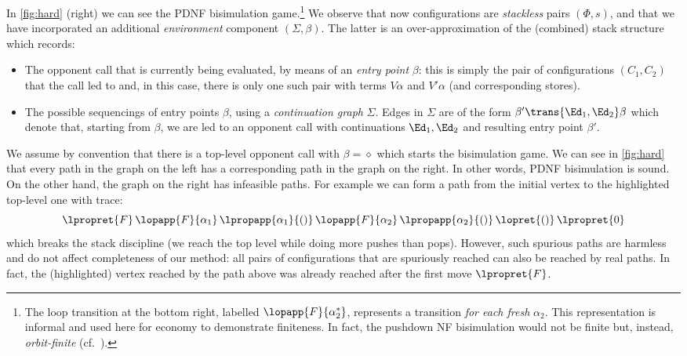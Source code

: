 \begin{example}
In \cref{fig:hard} (right) we can see the PDNF bisimulation game.\footnote{The loop transition at the bottom right, labelled $\lopapp{F}{\alpha_2^*}$, represents a transition \emph{for each fresh} $\alpha_2$. This representation is informal and used here for economy to demonstrate finiteness. In fact, the pushdown NF bisimulation would not be finite but, instead, \emph{orbit-finite} (cf.\ ).} We observe that now configurations are \emph{stackless} pairs $(\Phi,s)$, and that we have incorporated an additional \emph{environment} component $(\Sigma,\beta)$. The latter is an over-approximation of the (combined) stack structure which records:
\begin{itemize}
\item
  The opponent call that is currently being evaluated, by means of an \emph{entry point} $\beta$: this is simply the pair of configurations $(C_1,C_2)$ that the call led to and, in this case, there is only one such pair
  with terms $V\alpha$ and $V'\alpha$ (and corresponding stores).
\item
  The possible sequencings of entry points $\beta$, using a \emph{continuation graph} $\Sigma$.
  Edges in $\Sigma$ are of the form $\beta'\trans{\Ed_1,\Ed_2}\beta$ which denote that, starting from $\beta$, we are led to an opponent call 
  with continuations $\Ed_1,\Ed_2$ and resulting entry point $\beta'$.
\end{itemize}
We assume by convention that there is a top-level opponent call with $\beta=\diamond$ which starts the bisimulation game. We can see in \cref{fig:hard} that every path in the graph on the left has a corresponding path in the graph on the right. In other words, PDNF bisimulation is sound.
On the other hand, the graph on the right has infeasible paths. For example we can form a path from the initial vertex to the highlighted top-level one with trace:
\[
\lpropret{F}\,\lopapp{F}{\alpha_1}\,\lpropapp{\alpha_1}{()}\,\lopapp{F}{\alpha_2}\,\lpropapp{\alpha_2}{()}\,\lopret{()}\,\lpropret{0}
\]
which breaks the stack discipline (we reach the top level while doing more pushes than pops). However, such spurious paths are harmless and do not affect completeness of our method: all pairs of configurations that are spuriously reached can also be reached by real paths. In fact, the  (highlighted) vertex reached by the path above was already reached after the first move $\lpropret{F}$.
\end{example}











